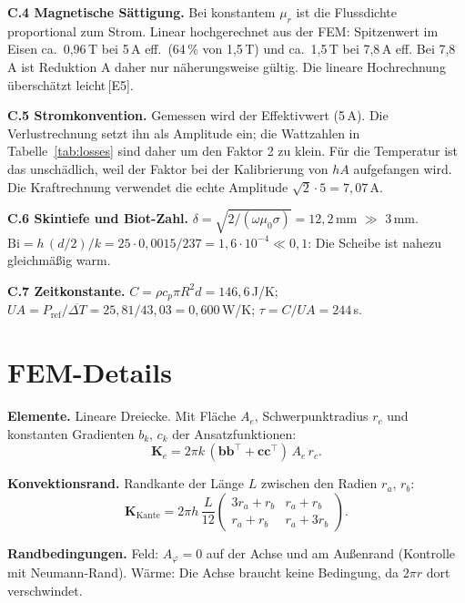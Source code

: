 \documentclass[a4paper, 10pt, conference]{ieeeconf}
\newcommand{\src}[1]{\,[#1]}
\newcommand{\anh}[1]{\par\medskip\noindent\textbf{#1}\quad}
\begin{document}
\anh{C.4 Magnetische Sättigung.} Bei konstantem $\mu_r$ ist die Flussdichte
proportional zum Strom. Linear hochgerechnet aus der FEM: Spitzenwert im
Eisen ca.\ 0,96\,T bei 5\,A eff.\ (64\,\% von 1,5\,T) und ca.\ 1,5\,T bei
7,8\,A eff. Bei 7,8\,A ist Reduktion A daher nur näherungsweise gültig. Die
lineare Hochrechnung überschätzt leicht\src{E5}.

\anh{C.5 Stromkonvention.} Gemessen wird der Effektivwert (5\,A). Die
Verlustrechnung setzt ihn als Amplitude ein; die Wattzahlen in
Tabelle~\ref{tab:losses} sind daher um den Faktor 2 zu klein. Für die
Temperatur ist das unschädlich, weil der Faktor bei der Kalibrierung von
$hA$ aufgefangen wird. Die Kraftrechnung verwendet die echte Amplitude
$\sqrt2\cdot5 = 7{,}07$\,A.

\anh{C.6 Skintiefe und Biot-Zahl.}
$\delta = \sqrt{2/(\omega\mu_0\sigma)} = 12{,}2$\,mm $\gg$ 3\,mm.
$\mathrm{Bi} = h\,(d/2)/k = 25\cdot0{,}0015/237 = 1{,}6\cdot10^{-4} \ll 0{,}1$:
Die Scheibe ist nahezu gleichmäßig warm.

\anh{C.7 Zeitkonstante.} $C = \rho c_p \pi R^2 d = 146{,}6$\,J/K;
$UA = P_{\mathrm{ref}}/\overline{\Delta T} = 25{,}81/43{,}03 = 0{,}600$\,W/K;
$\tau = C/UA = 244$\,s.

\section{FEM-Details}
\label{app:fem}

\anh{Elemente.} Lineare Dreiecke. Mit Fläche $A_e$, Schwerpunktradius $r_c$
und konstanten Gradienten $b_k$, $c_k$ der Ansatzfunktionen:
\begin{equation*}
\mathbf K_e = 2\pi k\,(\mathbf b\mathbf b^\top + \mathbf c\mathbf c^\top)\,A_e\,r_c .
\end{equation*}

\anh{Konvektionsrand.} Randkante der Länge $L$ zwischen den Radien $r_a$,
$r_b$:
\begin{equation*}
\mathbf K_{\mathrm{Kante}} = 2\pi h\,\frac{L}{12}
\begin{pmatrix}3r_a+r_b & r_a+r_b\\ r_a+r_b & r_a+3r_b\end{pmatrix}.
\end{equation*}

\anh{Randbedingungen.} Feld: $A_\varphi = 0$ auf der Achse und am Außenrand
(Kontrolle mit Neumann-Rand). Wärme: Die Achse braucht keine Bedingung, da
$2\pi r$ dort verschwindet.
\end{document}
